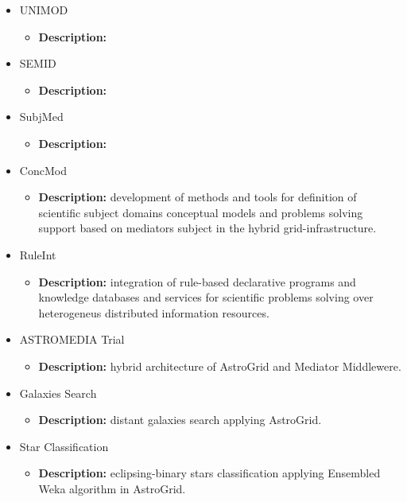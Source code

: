 \begin{itemize}
\begin{itemize}
\begin{itemize}
\item \textbf{Description:} methods and tools for supporting subject mediators
architecture in AstroGrid\footnote{\url{http://www.astrogrid.org/}}
infrastructure for the RVO.
\end{itemize}
\item UNIMOD
\begin{itemize}
\item \textbf{Description:}
\end{itemize}
\item SEMID
\begin{itemize}
\item \textbf{Description:}
\end{itemize}
\item SubjMed
\begin{itemize}
\item \textbf{Description:}
\end{itemize}
\item ConcMod
\begin{itemize}
\item \textbf{Description:} development of methods and tools for definition of
scientific subject domains conceptual models and problems solving support based
on mediators subject in the hybrid grid-infrastructure.
\end{itemize}
\item RuleInt
\begin{itemize}
\item \textbf{Description:} integration of rule-based declarative programs and
knowledge databases and services for scientific problems solving over
heterogeneus distributed information resources.
\end{itemize}
\item ASTROMEDIA Trial
\begin{itemize}
\item \textbf{Description:} hybrid architecture of AstroGrid and Mediator
Middlewere.
\end{itemize}
\item Galaxies Search
\begin{itemize}
\item \textbf{Description:} distant galaxies search applying AstroGrid.
\end{itemize}
\item Star Classification
\begin{itemize}
\item \textbf{Description:} eclipsing-binary stars classification applying
Ensembled Weka algorithm in AstroGrid.
\end{itemize}
\end{itemize}
\end{itemize}

